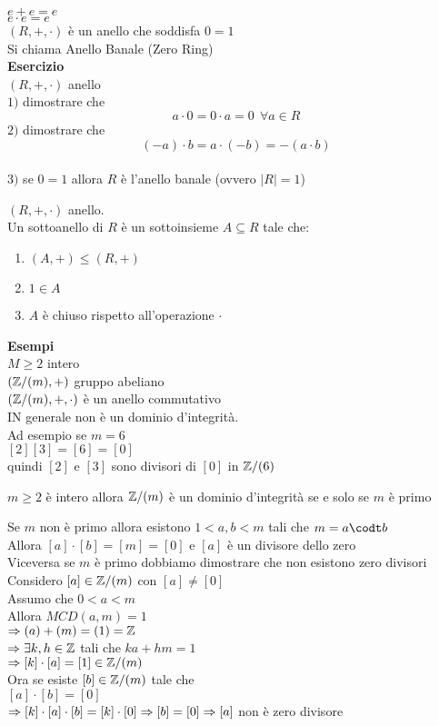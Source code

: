 \documentclass[12px]{article}
\begin{document}
	 $e + e = e$\\
	  $e\cdot e = e$\\
	   $(R,+,\cdot)$ è un anello che soddisfa $0 =1$\\
	   Si chiama Anello Banale (Zero Ring) \\
	   \textbf{Esercizio}\\
	   $(R,+,\cdot)$ anello\\
	   $1)$ dimostrare che  \[a \cdot 0 =0\cdot a  = 0 \ \ \forall a\in R\]
   $2)$ dimostrare che  \[(-a)\cdot b = a\cdot (-b) = - (a \cdot b)\]\\
   $3)$ se $0 = 1$ allora  $R$ è l'anello banale (ovvero $|R| = 1$)\\
    \begin{defi}
   	$(R, + ,\cdot)$ anello.\\
	Un sottoanello di $R$ è un sottoinsieme $A\subseteq R$ tale che:\\
	\begin{enumerate}
		\item $(A,+) \leq (R,+)$
		\item $1\in A$
		\item $A$ è chiuso rispetto all'operazione  $\cdot$
	\end{enumerate}
   \end{defi}
\textbf{Esempi}\\
$M\geq 2$ intero\\
 $(\mathbb{Z}/(m), + )$ gruppo abeliano\\
$(\mathbb{Z}/(m), + , \cdot)$ è un anello commutativo\\
IN generale non è un dominio d'integrità.\\
Ad esempio se  $m=6 $\\
$[2][3]=[6]=[0]$\\
quindi  $[2]$ e $[3]$ sono divisori di $[0]$ in $\mathbb{Z}/(6)$
\begin{prop}
	$m\geq 2 $ è intero allora $\mathbb{Z}/(m)$ è un dominio d'integrità se e solo se $m$ è primo
\end{prop}
\begin{dimo}
	Se $m$ non è primo allora esistono $1<a,b < m$ tali che $m = a\codt b$\\
	Allora  $[a]\cdot[b] = [m] = [0]$ e  $[a]$ è un divisore dello zero\\
	Viceversa se $m$ è primo dobbiamo dimostrare che non esistono zero divisori \\
	Considero $[a]\in\mathbb{Z}/(m)$ con $[a]\neq [0]$\\
	Assumo che  $0< a < m$ \\
	Allora $MCD(a,m) = 1$\\
	$ \Rightarrow (a) + (m) = (1) =\mathbb{Z}$ \\
	$ \Rightarrow \exists k,h\in \mathbb{Z}$ tali che $ka + hm = 1$\\
	$ \Rightarrow [k]\cdot [a] = [1]\in \mathbb{Z}/(m)$\\
	Ora se esiste $[b]\in \mathbb{Z}/(m)$ tale che\\
	$[a]\cdot[b] = [0]$\\
	$ \Rightarrow [k]\cdot[a]\cdot[b] = [k]\cdot [0]\\
	\Rightarrow [b] = [0]\\
	\Rightarrow  [a]$  non è zero divisore
\end{dimo}
\end{document}
